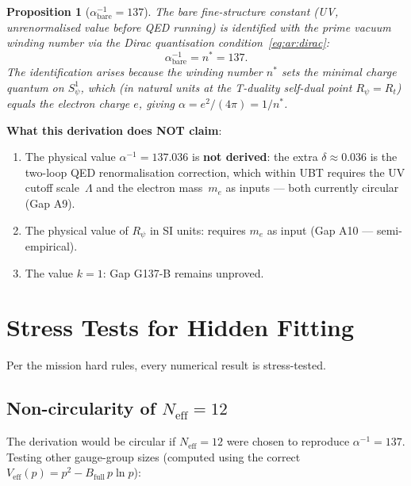 \documentclass[12pt,a4paper]{article}
\newtheorem{proposition}[theorem]{Proposition}
\theoremstyle{definition}
\theoremstyle{remark}
\begin{document}
\begin{proposition}[$\alpha^{-1}_{\mathrm{bare}} = 137$]
\label{prop:ar:alpha}
The bare fine-structure constant (UV, unrenormalised value before QED running)
is identified with the prime vacuum winding number via the Dirac quantisation
condition~\eqref{eq:ar:dirac}:
\begin{equation}
  \alpha^{-1}_{\mathrm{bare}} = n^* = 137.
  \label{eq:ar:alpha_bare}
\end{equation}
The identification arises because the winding number $n^*$ sets the minimal
charge quantum on $S^1_\psi$, which (in natural units at the T-duality self-dual
point $R_\psi = R_t$) equals the electron charge $e$, giving
$\alpha = e^2/(4\pi) = 1/n^*$.
\end{proposition}

\begin{warnbox}
\textbf{What this derivation does NOT claim}:
\begin{enumerate}
  \item The physical value $\alpha^{-1} = 137.036$ is \textbf{not derived}:
        the extra $\delta \approx 0.036$
        is the two-loop QED renormalisation correction, which within UBT requires
        the UV cutoff scale~$\Lambda$ and the electron mass~$m_e$ as inputs —
        both currently circular (Gap A9).
  \item The physical value of $R_\psi$ in SI units: requires $m_e$ as input
        (Gap A10 — semi-empirical).
  \item The value $k = 1$: Gap G137-B remains unproved.
\end{enumerate}
\end{warnbox}

\section{Stress Tests for Hidden Fitting}
\label{sec:ar:stresstests}

Per the mission hard rules, every numerical result is stress-tested.

\subsection{Non-circularity of $N_{\mathrm{eff}} = 12$}

The derivation would be circular if $N_{\mathrm{eff}} = 12$ were chosen to
reproduce $\alpha^{-1} = 137$.  Testing other gauge-group sizes
(computed using the correct $V_{\mathrm{eff}}(p) = p^2 - B_{\mathrm{full}}\,p\ln p$):
\end{document}
